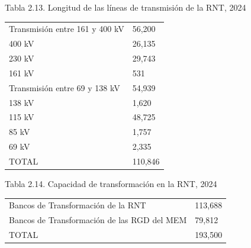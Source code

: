 \documentclass{sener2025}
\begin{document}
\begin{tabladoradoCorto}
  \caption{Tabla 2.13. Longitud de las líneas de transmisión de la RNT, 2024}
  \label{tab:tabla_2_13__longitud_de_las_li}
  \begin{tabularx}{\textwidth}{Vv}
    \toprule
      &  \\
    \midrule
    Transmisión entre 161 y 400 kV & 56,200 \\
    400 kV & 26,135 \\
    230 kV & 29,743 \\
    161 kV & 531 \\
    Transmisión entre 69 y 138 kV & 54,939 \\
    138 kV & 1,620 \\
    115 kV & 48,725 \\
    85 kV & 1,757 \\
    69 kV & 2,335 \\
    TOTAL & 110,846 \\
    \bottomrule
  \end{tabularx}
\end{tabladoradoCorto}
\vspace{-4pt}

\begin{tabladoradoCorto}
  \caption{Tabla 2.14. Capacidad de transformación en la RNT, 2024}
  \label{tab:tabla_2_14__capacidad_de_trans}
  \begin{tabularx}{\textwidth}{Vv}
    \toprule
      &  \\
    \midrule
    Bancos de Transformación de la RNT & 113,688 \\
    Bancos de Transformación de las RGD del MEM & 79,812 \\
    TOTAL & 193,500 \\
    \bottomrule
  \end{tabularx}
\end{tabladoradoCorto}
\vspace{-4pt}
\end{document}
